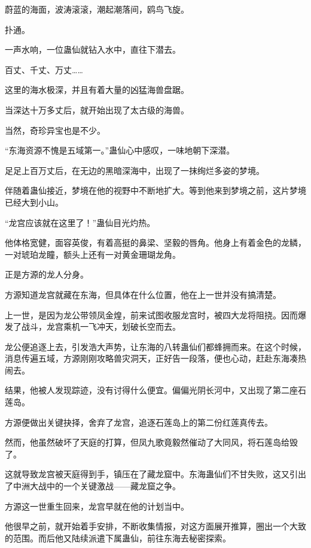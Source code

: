 
\begin{this_body}



蔚蓝的海面，波涛滚滚，潮起潮落间，鸥鸟飞旋。

扑通。

一声水响，一位蛊仙就钻入水中，直往下潜去。

百丈、千丈、万丈……

这里的海水极深，并且有着大量的凶猛海兽盘踞。

当深达十万多丈后，就开始出现了太古级的海兽。

当然，奇珍异宝也是不少。

“东海资源不愧是五域第一。”蛊仙心中感叹，一味地朝下深潜。

足足上百万丈后，在无边的黑暗深海中，出现了一抹绚烂多姿的梦境。

伴随着蛊仙接近，梦境在他的视野中不断地扩大。等到他来到梦境之前，这片梦境已经大到小山。

“龙宫应该就在这里了！”蛊仙目光灼热。

他体格宽健，面容英俊，有着高挺的鼻梁、坚毅的唇角。他身上有着金色的龙鳞，一对琥珀龙瞳，额头上还有一对黄金珊瑚龙角。

正是方源的龙人分身。

方源知道龙宫就藏在东海，但具体在什么位置，他在上一世并没有搞清楚。

上一世，是因为龙公带领凤金煌，前来试图收服龙宫时，被四大龙将阻挠。因而爆发了战斗，龙宫乘机一飞冲天，划破长空而去。

龙公便追逐上去，引发浩大声势，让东海的八转蛊仙们都蜂拥而来。在这个时候，消息传遍五域，方源刚刚攻略兽灾洞天，正好告一段落，便也心动，赶赴东海凑热闹去。

结果，他被人发现踪迹，没有讨得什么便宜。偏偏光阴长河中，又出现了第二座石莲岛。

方源便做出关键抉择，舍弃了龙宫，追逐石莲岛上的第二份红莲真传去。

然而，他虽然破坏了天庭的打算，但凤九歌竟毅然催动了大同风，将石莲岛给毁了。

这就导致龙宫被天庭得到手，镇压在了藏龙窟中。东海蛊仙们不甘失败，这又引出了中洲大战中的一个关键激战——藏龙窟之争。

方源这一世重生回来，龙宫早就在他的计划当中。

他很早之前，就开始着手安排，不断收集情报，对这方面展开推算，圈出一个大致的范围。而后他又陆续派遣下属蛊仙，前往东海去秘密探索。


\end{this_body}
